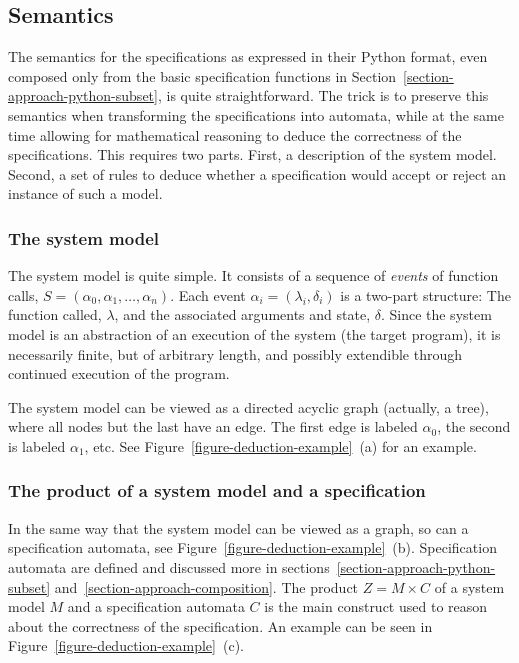 \documentclass[a4paper,11pt]{kth-mag}
\theoremstyle{definition}
\begin{document}
\subsection{Semantics} \label{section-approach-semantics}

The semantics for the specifications as expressed in their Python format, even
composed only from the basic specification functions in
Section~\ref{section-approach-python-subset}, is quite straightforward. The
trick is to preserve this semantics when transforming the specifications into
automata, while at the same time allowing for mathematical reasoning to deduce
the correctness of the specifications. This requires two parts. First, a
description of the system model. Second, a set of rules to deduce whether a
specification would accept or reject an instance of such a model.


\subsubsection{The system model}

The system model is quite simple. It consists of a sequence of \textit{events}
of function calls, $S = (\alpha_0, \alpha_1, \dots, \alpha_n)$. Each event
$\alpha_i = (\lambda_i, \delta_i)$ is a two-part structure: The function
called, $\lambda$, and the associated arguments and state, $\delta$. Since the
system model is an abstraction of an execution of the system (the target
program), it is necessarily finite, but of arbitrary length, and possibly
extendible through continued execution of the program.

The system model can be viewed as a directed acyclic graph (actually, a tree),
where all nodes but the last have an edge. The first edge is labeled
$\alpha_0$, the second is labeled $\alpha_1$, etc. See
Figure~\ref{figure-deduction-example}~(a) for an example.


\subsubsection{The product of a system model and a specification}

In the same way that the system model can be viewed as a graph, so can a
specification automata, see Figure~\ref{figure-deduction-example}~(b).
Specification automata are defined and discussed more in
sections~\ref{section-approach-python-subset}
and~\ref{section-approach-composition}. The
product $Z = M \times C$ of a system model $M$ and a specification automata $C$
is the main construct used to reason about the correctness of the
specification. An example can be seen in
Figure~\ref{figure-deduction-example}~(c).
\end{document}
